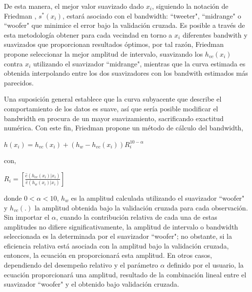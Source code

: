 \hspace*{0.4 cm} De esta manera, el mejor valor suavizado dado $x_{i}$, siguiendo la notaci\'on de Friedman \cite{F}, $s^{*}(x_{i})$, estar\'a asociado con el bandwidth: ``tweeter", ``midrange" \hspace*{0.01 cm} o ``woofer" que minimice el error bajo la validaci\'on cruzada. Es posible a trav\'es de esta metodolog\'ia obtener para cada vecindad en torno a $x_{i}$ diferentes bandwith y suavizados que proporcionan resultados \'optimos, por tal raz\'on, Friedman \cite{F} propone seleccionar la mejor amplitud de intervalo, suavizando los $h_{vc} (x_{i})$ contra $x_{i}$ utilizando el suavizador ``midrange", mientras que la curva estimada es obtenida interpolando entre los dos suavizadores con los bandwith estimados m\'as parecidos.


\hspace*{0.4 cm} Una suposici\'on general establece que la curva subyacente que describe el comportamiento de los datos es suave, as\'i que ser\'ia posible modificar el bandwidth en procura de un mayor suavizamiento, sacrificando exactitud num\'erica. Con este fin, Friedman \cite{F} propone un m\'etodo de c\'alculo del bandwidth,

\vspace*{0.2 cm}

\begin{center}
$\displaystyle{h(x_{i}) = h_{vc}(x_{i}) + (h_{w} - h_{vc}(x_{i}))R_{i}^{10-\alpha}}$
\end{center}

\vspace*{0.2 cm}

\noindent con, 

\vspace*{0.2 cm}

\begin{center}
$\displaystyle{R_{i} = \left[\frac{\hat{e}(h_{vc}(x_{i})|x_{i})}{\hat{e}(h_{w}(x_{i})|x_{i})} \right] }$
\end{center}

\vspace*{0.2 cm}

\noindent donde $0 < \alpha < 10$, $h_{w}$ es la amplitud calculada utilizando 
el suavizador ``woofer"\hspace*{0.01 cm} y $h_{vc}(.)$ la amplitud obtenida bajo la validaci\'on cruzada para cada observaci\'on. Sin importar el $\alpha$, cuando la contribuci\'on relativa de cada una de estas amplitudes no difiere significativamente, la amplitud de intervalo o bandwidth seleccionada es la determinada por el suavizador ``woofer"\hspace*{0.01 cm}; no obstante, si la eficiencia relativa est\'a asociada con la amplitud bajo la validaci\'on cruzada, entonces, la ecuaci\'on en proporcionar\'a esta amplitud. En otros casos, dependiendo del desempe\~no relativo y el par\'ametro $\alpha$ definido por el usuario, la ecuaci\'on proporcionar\'a una amplitud, resultado de la combinaci\'on lineal entre el suavizador ``woofer" \hspace*{0.01 cm} y el obtenido bajo validaci\'on cruzada.

